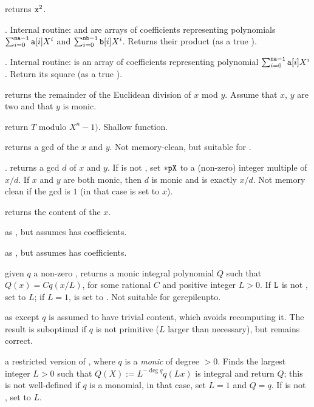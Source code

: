  returns ${\tt x}^2$.

. Internal routine:
 and  are arrays of coefficients representing polynomials
$\sum_{i = 0}^{{\tt na-1}} {\tt a}[i] X^i$ and
$\sum_{i = 0}^{{\tt nb-1}} {\tt b}[i] X^i$. Returns their product (as a true
).

. Internal routine:
 is an array of coefficients representing polynomial
$\sum_{i = 0}^{{\tt na-1}} {\tt a}[i] X^i$. Return its square (as a true
).

 returns the remainder of the Euclidean
division of $x$ mod $y$. Assume that $x$, $y$ are two  and that
$y$ is monic.

 return $T$ modulo $X^n - 1)$. Shallow
function.

 returns a gcd of the  $x$ and $y$.
Not memory-clean, but suitable for .

. returns a gcd $d$ of $x$ and
$y$. If  is not , set ${\tt *pX}$ to a (non-zero) integer
multiple of $x/d$. If $x$ and $y$ are both monic, then $d$ is monic and
 is exactly $x/d$. Not memory clean if the gcd is $1$
(in that case  is set to $x$).

 returns the content of the  $x$.

 as , but assumes  has 
coefficients.

 as , but assumes
 has  coefficients.

 given $q$ a non-zero ,
returns a monic integral polynomial $Q$ such that $Q(x) = C q(x/L)$, for some
rational $C$ and positive integer $L > 0$. If ${\tt L}$ is not ,
set  to $L$; if $L = 1$,  is set to . Not
suitable for gerepileupto.

 as  except
$q$ is assumed to have trivial content, which avoids recomputing it.
The result is suboptimal if $q$ is not primitive ($L$ larger than
necessary), but remains correct.

 a restricted version of
, where $q$ is a \emph{monic} 
of degree $> 0$. Finds the largest integer $L > 0$ such that
$Q(X) := L^{-\deg q} q(Lx)$ is integral and return $Q$; this is not
well-defined if $q$ is a monomial, in that case, set $L=1$ and $Q = q$. If
 is not , set  to $L$.

